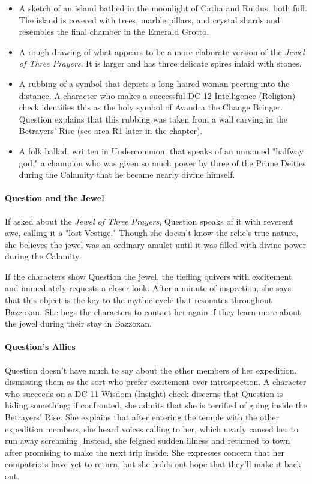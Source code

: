 \documentclass[letterpaper, 11pt, bg=full, twocolumn]{dndbook}
\begin{document}
\begin{itemize}
\item A sketch of an island bathed in the moonlight of Catha and Ruidus, both full. The island is covered with trees, marble pillars, and crystal shards and resembles the final chamber in the Emerald Grotto.
\item A rough drawing of what appears to be a more elaborate version of the \textit{Jewel of Three Prayers}. It is larger and has three delicate spires inlaid with stones.
\item A rubbing of a symbol that depicts a long-haired woman peering into the distance. A character who makes a successful DC 12 Intelligence (Religion) check identifies this as the holy symbol of Avandra the Change Bringer. Question explains that this rubbing was taken from a wall carving in the Betrayers' Rise (see area R1 later in the chapter).
\item A folk ballad, written in Undercommon, that speaks of an unnamed "halfway god," a champion who was given so much power by three of the Prime Deities during the Calamity that he became nearly divine himself.
\end{itemize}

\paragraph{Question and the Jewel}

If asked about the \textit{Jewel of Three Prayers}, Question speaks of it with reverent awe, calling it a "lost Vestige." Though she doesn't know the relic's true nature, she believes the jewel was an ordinary amulet until it was filled with divine power during the Calamity.

If the characters show Question the jewel, the tiefling quivers with excitement and immediately requests a closer look. After a minute of inspection, she says that this object is the key to the mythic cycle that resonates throughout Bazzoxan. She begs the characters to contact her again if they learn more about the jewel during their stay in Bazzoxan.

\paragraph{Question's Allies}

Question doesn't have much to say about the other members of her expedition, dismissing them as the sort who prefer excitement over introspection. A character who succeeds on a DC 11 Wisdom (Insight) check discerns that Question is hiding something; if confronted, she admits that she is terrified of going inside the Betrayers' Rise. She explains that after entering the temple with the other expedition members, she heard voices calling to her, which nearly caused her to run away screaming. Instead, she feigned sudden illness and returned to town after promising to make the next trip inside. She expresses concern that her compatriots have yet to return, but she holds out hope that they'll make it back out.
\end{document}
